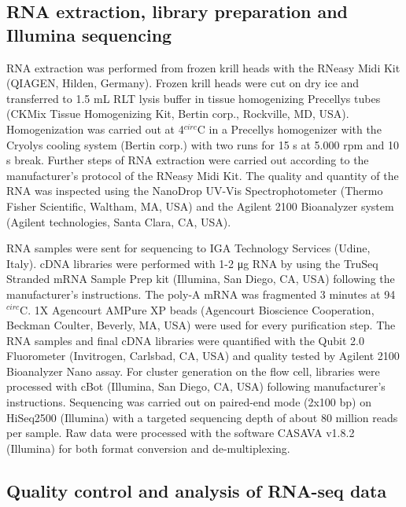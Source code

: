 \subsection{RNA extraction, library preparation and Illumina sequencing}

RNA extraction was performed from frozen krill heads with the RNeasy Midi Kit
(QIAGEN, Hilden, Germany). Frozen krill heads were cut on dry ice and
transferred to 1.5 mL RLT lysis buffer in tissue homogenizing
Precellys\textsuperscript{\textregistered} tubes (CKMix Tissue Homogenizing
Kit, Bertin corp., Rockville, MD, USA).  Homogenization was carried out at
4$^{circ}$C in a Precellys\textsuperscript{\textregistered} homogenizer with
the Cryolys\textsuperscript{\textregistered} cooling system (Bertin corp.) with
two runs for 15 s at 5.000 rpm and 10 s break. Further steps of RNA extraction
were carried out according to the manufacturer's protocol of the RNeasy Midi
Kit. The quality and quantity of the RNA was inspected using the
NanoDrop UV-Vis Spectrophotometer (Thermo Fisher Scientific,
Waltham, MA, USA) and the Agilent 2100 Bioanalyzer system (Agilent
technologies, Santa Clara, CA, USA).

RNA samples were sent for sequencing to IGA Technology Services (Udine, Italy).
cDNA libraries were performed with 1-2 μg RNA by using the TruSeq Stranded mRNA
Sample Prep kit (Illumina, San Diego, CA, USA) following the manufacturer's
instructions. The poly-A mRNA was fragmented 3 minutes at 94$^{circ}$C. 1X
Agencourt AMPure XP beads (Agencourt Bioscience Cooperation, Beckman Coulter,
Beverly, MA, USA) were used for every purification step. The RNA samples and
final cDNA libraries were quantified with the Qubit 2.0 Fluorometer
(Invitrogen, Carlsbad, CA, USA) and quality tested by Agilent 2100 Bioanalyzer
Nano assay.  For cluster generation on the flow cell, libraries were processed
with cBot (Illumina, San Diego, CA, USA) following manufacturer's instructions.
Sequencing was carried out on paired-end mode (2x100 bp) on HiSeq2500
(Illumina) with a targeted sequencing depth of about 80 million reads per
sample. Raw data were processed with the software CASAVA v1.8.2 (Illumina) for
both format conversion and de-multiplexing.

\subsection{Quality control and analysis of RNA-seq data}

